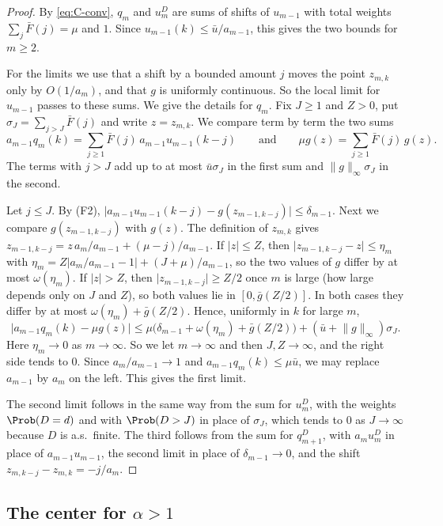 \begin{proof}
By \eqref{eq:C-conv}, $q_m$ and $u^D_m$ are sums of shifts of $u_{m-1}$ with total
weights $\sum_j\bar F(j)=\mu$ and $1$. Since $u_{m-1}(k)\le\bar u/a_{m-1}$, this gives the
two bounds for $m\ge2$.

For the limits we use that a shift by a bounded amount $j$ moves the point $z_{m,k}$ only
by $O(1/a_m)$, and that $g$ is uniformly continuous. So the local limit for $u_{m-1}$
passes to these sums. We give the details for $q_m$. Fix $J\ge1$ and $Z>0$, put
$\sigma_J=\sum_{j>J}\bar F(j)$ and write $z=z_{m,k}$. We compare term by term the two sums
\[
a_{m-1}q_m(k)=\sum_{j\ge1}\bar F(j)\,a_{m-1}u_{m-1}(k-j)\qquad\text{and}\qquad
\mu g(z)=\sum_{j\ge1}\bar F(j)\,g(z).
\]
The terms with $j>J$ add up to at most $\bar u\sigma_J$ in the first sum and
$\lVert g\rVert_\infty\sigma_J$ in the second.

Let $j\le J$. By (F2),
$\lvert a_{m-1}u_{m-1}(k-j)-g(z_{m-1,k-j})\rvert\le\delta_{m-1}$. Next we compare
$g(z_{m-1,k-j})$ with $g(z)$. The definition of $z_{m,k}$ gives
$z_{m-1,k-j}=z\,a_m/a_{m-1}+(\mu-j)/a_{m-1}$. If $\lvert z\rvert\le Z$, then
$\lvert z_{m-1,k-j}-z\rvert\le\eta_m$ with
$\eta_m=Z\lvert a_m/a_{m-1}-1\rvert+(J+\mu)/a_{m-1}$, so the two values of $g$ differ by
at most $\omega(\eta_m)$. If $\lvert z\rvert>Z$, then
$\lvert z_{m-1,k-j}\rvert\ge Z/2$ once $m$ is large (how large depends only on $J$ and
$Z$), so both values lie in $[0,\bar g(Z/2)]$. In both cases they differ by at most
$\omega(\eta_m)+\bar g(Z/2)$. Hence, uniformly in $k$ for large $m$,
\[
\bigl\lvert a_{m-1}q_m(k)-\mu g(z)\bigr\rvert
\le\mu\bigl(\delta_{m-1}+\omega(\eta_m)+\bar g(Z/2)\bigr)
+(\bar u+\lVert g\rVert_\infty)\sigma_J .
\]
Here $\eta_m\to0$ as $m\to\infty$. So we let $m\to\infty$ and then $J,Z\to\infty$, and
the right side tends to $0$. Since $a_m/a_{m-1}\to1$ and $a_{m-1}q_m(k)\le\mu\bar u$, we
may replace $a_{m-1}$ by $a_m$ on the left. This gives the first limit.

The second limit follows in the same way from the sum for $u^D_m$, with the weights
$\Prob(D=d)$ and with $\Prob(D>J)$ in place of $\sigma_J$, which tends to $0$ as
$J\to\infty$ because $D$ is a.s.\ finite. The third follows from the sum for $q^D_{m+1}$, with
$a_mu^D_m$ in place of $a_{m-1}u_{m-1}$, the second limit in place of $\delta_{m-1}\to0$,
and the shift $z_{m,k-j}-z_{m,k}=-j/a_m$.
\end{proof}

\subsection{The center for \texorpdfstring{$\alpha>1$}{alpha > 1}}

